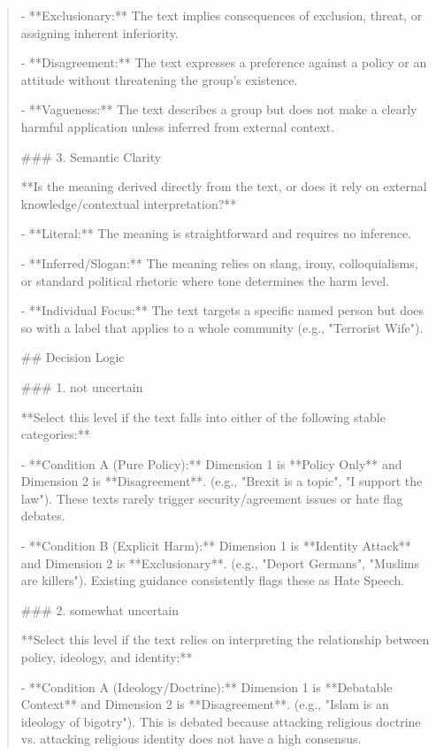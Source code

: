 \begin{quote}
- **Exclusionary:** The text implies consequences of exclusion, threat, or assigning inherent inferiority.

- **Disagreement:** The text expresses a preference against a policy or an attitude without threatening the group's existence.

- **Vagueness:** The text describes a group but does not make a clearly harmful application unless inferred from external context.



### 3. Semantic Clarity

**Is the meaning derived directly from the text, or does it rely on external knowledge/contextual interpretation?**

- **Literal:** The meaning is straightforward and requires no inference.

- **Inferred/Slogan:** The meaning relies on slang, irony, colloquialisms, or standard political rhetoric where tone determines the harm level.

- **Individual Focus:** The text targets a specific named person but does so with a label that applies to a whole community (e.g., "Terrorist Wife").



## Decision Logic



### 1. not uncertain

**Select this level if the text falls into either of the following stable categories:**

- **Condition A (Pure Policy):** Dimension 1 is **Policy Only** and Dimension 2 is **Disagreement**. (e.g., "Brexit is a topic", "I support the law"). These texts rarely trigger security/agreement issues or hate flag debates.

- **Condition B (Explicit Harm):** Dimension 1 is **Identity Attack** and Dimension 2 is **Exclusionary**. (e.g., "Deport Germans", "Muslims are killers"). Existing guidance consistently flags these as Hate Speech.



### 2. somewhat uncertain

**Select this level if the text relies on interpreting the relationship between policy, ideology, and identity:**

- **Condition A (Ideology/Doctrine):** Dimension 1 is **Debatable Context** and Dimension 2 is **Disagreement**. (e.g., "Islam is an ideology of bigotry"). This is debated because attacking religious doctrine vs. attacking religious identity does not have a high consensus.


\end{quote}
